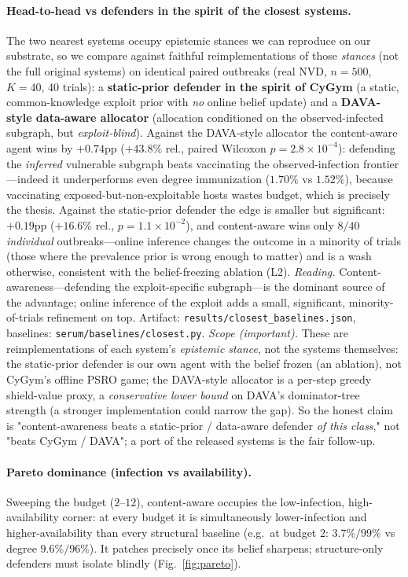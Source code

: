 \documentclass[11pt]{article}
\begin{document}
\paragraph{Head-to-head vs defenders in the spirit of the closest systems.} The
two nearest systems occupy epistemic stances we can reproduce on our substrate, so
we compare against faithful reimplementations of those \emph{stances} (not the full
original systems) on identical paired outbreaks (real NVD, $n{=}500$, $K{=}40$, 40
trials): a \textbf{static-prior defender in the spirit of CyGym} (a static,
common-knowledge exploit prior with \emph{no} online belief update) and a
\textbf{DAVA-style data-aware allocator} (allocation conditioned on the
observed-infected subgraph, but \emph{exploit-blind}). Against the DAVA-style
allocator the content-aware agent wins by $+0.74$pp ($+43.8\%$ rel., paired
Wilcoxon $p=2.8\times10^{-4}$): defending the \emph{inferred} vulnerable subgraph
beats vaccinating the observed-infection frontier---indeed it underperforms even
degree immunization ($1.70\%$ vs $1.52\%$), because vaccinating
exposed-but-non-exploitable hosts wastes budget, which is precisely the thesis.
Against the static-prior defender the edge is smaller but
significant: $+0.19$pp ($+16.6\%$ rel., $p=1.1\times10^{-2}$), and content-aware
wins only $8/40$ \emph{individual} outbreaks---online inference changes the
outcome in a minority of trials (those where the prevalence prior is wrong enough
to matter) and is a wash otherwise, consistent with the belief-freezing ablation
(L2). \emph{Reading.} Content-awareness---defending the exploit-specific
subgraph---is the dominant source of the advantage; online inference of the
exploit adds a small, significant, minority-of-trials refinement on top. Artifact:
\texttt{results/closest\_baselines.json}, baselines: \texttt{serum/baselines/closest.py}.
\emph{Scope (important).} These are reimplementations of each system's
\emph{epistemic stance}, not the systems themselves: the static-prior defender is
our own agent with the belief frozen (an ablation), not CyGym's offline PSRO game;
the DAVA-style allocator is a per-step greedy shield-value proxy, a
\emph{conservative lower bound} on DAVA's dominator-tree strength (a stronger
implementation could narrow the gap). So the honest claim is "content-awareness
beats a static-prior / data-aware defender \emph{of this class}," not "beats CyGym
/ DAVA"; a port of the released systems is the fair follow-up.

\paragraph{Pareto dominance (infection vs availability).} Sweeping the budget
($2$--$12$), content-aware occupies the low-infection, high-availability corner:
at every budget it is simultaneously lower-infection and higher-availability than
every structural baseline (e.g.\ at budget $2$: $3.7\%/99\%$ vs degree
$9.6\%/96\%$). It patches precisely once its belief sharpens; structure-only
defenders must isolate blindly (Fig.~\ref{fig:pareto}).
\end{document}
